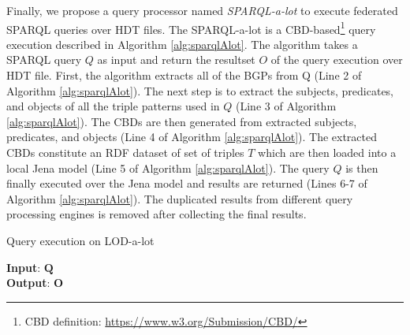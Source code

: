 Finally, we propose a query processor named \emph{SPARQL-a-lot} to execute federated SPARQL queries over HDT files. The SPARQL-a-lot is a CBD-based\footnote{\label{cbd}CBD definition: \url{https://www.w3.org/Submission/CBD/}} query execution described in Algorithm \ref{alg:sparqlAlot}. The algorithm takes a SPARQL query $Q$ as input and return the resultset $O$ of the query execution over HDT file. First, the algorithm extracts all of the BGPs from Q (Line 2 of Algorithm \ref{alg:sparqlAlot}). The next step is to extract the subjects, predicates, and objects of all the triple patterns used in $Q$ (Line 3 of Algorithm \ref{alg:sparqlAlot}). The CBDs are then generated from extracted subjects, predicates, and objects (Line 4 of Algorithm \ref{alg:sparqlAlot}). The extracted CBDs constitute an RDF dataset of set of triples $T$ which are then loaded into a local Jena model (Line 5 of Algorithm \ref{alg:sparqlAlot}). The query $Q$ is then finally executed over the Jena model and results are returned (Lines 6-7 of Algorithm \ref{alg:sparqlAlot}). The duplicated results from different query processing engines is removed after collecting the final results. 

\begin{algorithm} [H] 
	\caption{Query execution on LOD-a-lot}
	\label{alg:sparqlAlot}
    	\textbf{Input}: $\mathbf{Q}$  \\
    	\textbf{Output}: $\mathbf{O}$ 
    	\begin{algorithmic}[1]    		
        		  
        		 
    		\EndProcedure
    	\end{algorithmic}
\end{algorithm}


